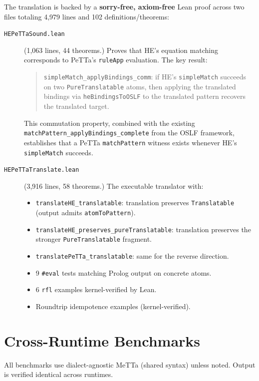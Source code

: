 \documentclass[11pt]{article}
\newcommand{\code}[1]{\texttt{#1}}
\newcommand{\PeTTa}{\textup{PeTTa}}
\newcommand{\HE}{\textup{HE}}
\begin{document}
The translation is backed by a \textbf{sorry-free, axiom-free} Lean
proof across two files totaling 4{,}979 lines and 102
definitions/theorems:

\begin{description}
\item[\code{HEPeTTaSound.lean}] (1{,}063 lines, 44 theorems.)
  Proves that \HE{}'s equation matching corresponds to \PeTTa{}'s
  \code{ruleApp} evaluation.  The key result:
  \begin{quote}
  \code{simpleMatch\_applyBindings\_comm}: if \HE{}'s
  \code{simpleMatch} succeeds on two \code{PureTranslatable} atoms,
  then applying the translated bindings via \code{heBindingsToOSLF} to
  the translated pattern recovers the translated target.
  \end{quote}
  This commutation property, combined with the existing
  \code{matchPattern\_applyBindings\_complete} from the OSLF framework,
  establishes that a \PeTTa{} \code{matchPattern} witness exists
  whenever \HE{}'s \code{simpleMatch} succeeds.

\item[\code{HEPeTTaTranslate.lean}] (3{,}916 lines, 58 theorems.)
  The executable translator with:
  \begin{itemize}
  \item \code{translateHE\_translatable}: translation preserves
    \code{Translatable} (output admits \code{atomToPattern}).
  \item \code{translateHE\_preserves\_pureTranslatable}: translation
    preserves the stronger \code{PureTranslatable} fragment.
  \item \code{translatePeTTa\_translatable}: same for the reverse
    direction.
  \item 9 \code{\#eval} tests matching Prolog output on concrete atoms.
  \item 6 \code{rfl} examples kernel-verified by Lean.
  \item Roundtrip idempotence examples (kernel-verified).
  \end{itemize}
\end{description}

\section{Cross-Runtime Benchmarks}

All benchmarks use dialect-agnostic MeTTa (shared syntax) unless noted.
Output is verified identical across runtimes.
\end{document}
